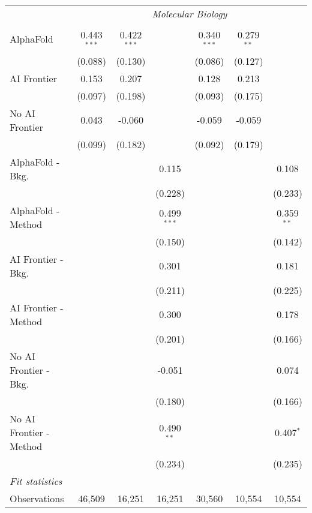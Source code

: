 \begin{tabular}{lcccccc}
 & \multicolumn{6}{c}{\textit{Molecular Biology}} \\ \\
   AlphaFold               & 0.443$^{***}$ & 0.422$^{***}$ &               & 0.340$^{***}$ & 0.279$^{**}$ &   \\   
                           & (0.088)       & (0.130)       &               & (0.086)       & (0.127)      &   \\   
   AI Frontier             & 0.153         & 0.207         &               & 0.128         & 0.213        &   \\   
                           & (0.097)       & (0.198)       &               & (0.093)       & (0.175)      &   \\   
   No AI Frontier          & 0.043         & -0.060        &               & -0.059        & -0.059       &   \\   
                           & (0.099)       & (0.182)       &               & (0.092)       & (0.179)      &   \\   
   AlphaFold - Bkg.        &               &               & 0.115         &               &              & 0.108\\   
                           &               &               & (0.228)       &               &              & (0.233)\\   
   AlphaFold - Method      &               &               & 0.499$^{***}$ &               &              & 0.359$^{**}$\\   
                           &               &               & (0.150)       &               &              & (0.142)\\   
   AI Frontier - Bkg.      &               &               & 0.301         &               &              & 0.181\\   
                           &               &               & (0.211)       &               &              & (0.225)\\   
   AI Frontier - Method    &               &               & 0.300         &               &              & 0.178\\   
                           &               &               & (0.201)       &               &              & (0.166)\\   
   No AI Frontier - Bkg.   &               &               & -0.051        &               &              & 0.074\\   
                           &               &               & (0.180)       &               &              & (0.166)\\   
   No AI Frontier - Method &               &               & 0.490$^{**}$  &               &              & 0.407$^{*}$\\   
                           &               &               & (0.234)       &               &              & (0.235)\\   
   \midrule
   \emph{Fit statistics}\\
   Observations            & 46,509        & 16,251        & 16,251        & 30,560        & 10,554       & 10,554\\  
   

\end{tabular}
